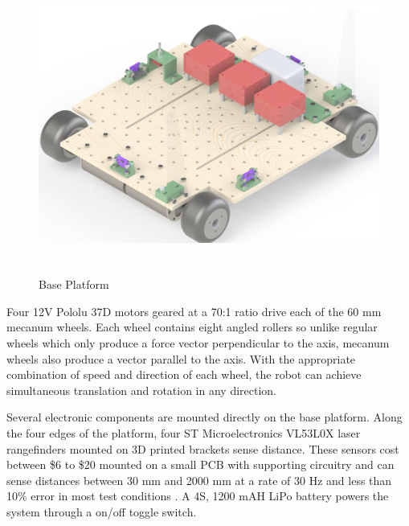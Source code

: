 \begin{figure}[H]   %
	\centering \includegraphics[width=6in, height=3.85in, keepaspectratio]{figures/base_platform.png}
	\caption{Base Platform}	\label{fig:base_platform}
\end{figure}

Four 12V Pololu 37D motors geared at a 70:1 ratio drive each of the 60 mm mecanum wheels. Each wheel contains eight angled rollers so unlike regular wheels which only produce a force vector perpendicular to the axis, mecanum wheels also produce a vector parallel to the axis. With the appropriate combination of speed and direction of each wheel, the robot can achieve simultaneous translation and rotation in any direction. 

Several electronic components are mounted directly on the base platform. Along the four edges of the platform, four ST Microelectronics VL53L0X laser rangefinders mounted on 3D printed brackets sense distance. These sensors cost between \$6 to \$20 mounted on a small PCB with supporting circuitry and can sense distances between 30 mm and 2000 mm at a rate of 30 Hz and less than 10\% error in most test conditions \cite{vl53l0x_datasheet}. A 4S, 1200 mAH LiPo battery powers the system through a on/off toggle switch. 

